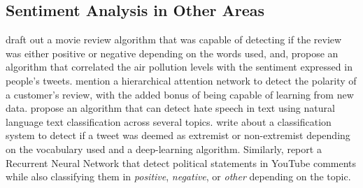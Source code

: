 \documentclass[review]{elsarticle} %
\begin{document}
\subsection{Sentiment Analysis in Other Areas}
\citet{rf5} draft out a movie review algorithm that was capable of detecting if the review was either positive or negative depending on the words used, and,
\citet{rf12} propose an algorithm that correlated the air pollution levels with the sentiment expressed in people's tweets.
\citet{rf13} mention a hierarchical attention network to detect the polarity of a customer's review, with the added bonus of being capable of learning from new data.
\citet{rf15} propose an algorithm that can detect hate speech in text using natural language text classification across several topics.
\citet{rf11} write about a classification system to detect if a tweet was deemed as extremist or non-extremist depending on the vocabulary used and a deep-learning algorithm. Similarly, \citet{rf16} report a Recurrent Neural Network that detect political statements in YouTube comments while also classifying them in \textit{positive}, \textit{negative}, or \textit{other} depending on the topic.
\end{document}
